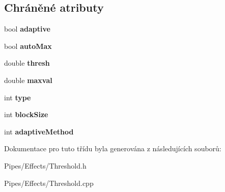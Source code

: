 \subsection*{Chráněné atributy}
\begin{DoxyCompactItemize}
\item 
\hypertarget{class_ar_pipe_1_1_threshold_ab3cd04c648cc5f96b04e6c2ceabe49c8}{bool {\bfseries adaptive}}\label{d8/df3/class_ar_pipe_1_1_threshold_ab3cd04c648cc5f96b04e6c2ceabe49c8}

\item 
\hypertarget{class_ar_pipe_1_1_threshold_ae9ee1f7a8848a82c4bf25465fc17b7c6}{bool {\bfseries auto\-Max}}\label{d8/df3/class_ar_pipe_1_1_threshold_ae9ee1f7a8848a82c4bf25465fc17b7c6}

\item 
\hypertarget{class_ar_pipe_1_1_threshold_aa7413e3cebd23047479e553755bd2cff}{double {\bfseries thresh}}\label{d8/df3/class_ar_pipe_1_1_threshold_aa7413e3cebd23047479e553755bd2cff}

\item 
\hypertarget{class_ar_pipe_1_1_threshold_a45b73051f1cfb52e3aa2a09c67911b63}{double {\bfseries maxval}}\label{d8/df3/class_ar_pipe_1_1_threshold_a45b73051f1cfb52e3aa2a09c67911b63}

\item 
\hypertarget{class_ar_pipe_1_1_threshold_a1b30d543651f4a3895c9afd566b57a91}{int {\bfseries type}}\label{d8/df3/class_ar_pipe_1_1_threshold_a1b30d543651f4a3895c9afd566b57a91}

\item 
\hypertarget{class_ar_pipe_1_1_threshold_aa591a8a887a078d0209694628abab758}{int {\bfseries block\-Size}}\label{d8/df3/class_ar_pipe_1_1_threshold_aa591a8a887a078d0209694628abab758}

\item 
\hypertarget{class_ar_pipe_1_1_threshold_a784900859a1295579ee7c792e986ae52}{int {\bfseries adaptive\-Method}}\label{d8/df3/class_ar_pipe_1_1_threshold_a784900859a1295579ee7c792e986ae52}

\end{DoxyCompactItemize}


Dokumentace pro tuto třídu byla generována z následujících souborů\-:\begin{DoxyCompactItemize}
\item 
Pipes/\-Effects/Threshold.\-h\item 
Pipes/\-Effects/Threshold.\-cpp\end{DoxyCompactItemize}
